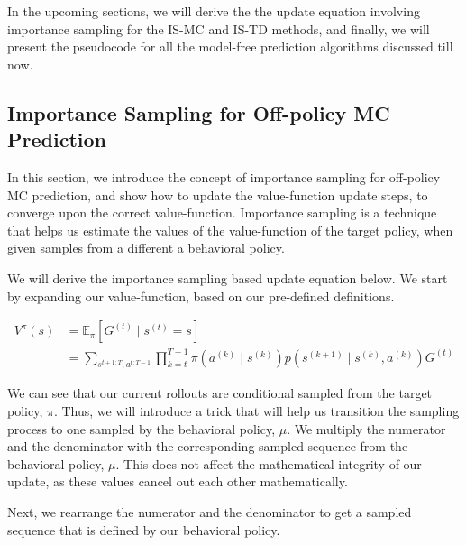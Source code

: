 \documentclass[11pt]{article}
\begin{document}
In the upcoming sections, we will derive the the update equation involving importance sampling for the IS-MC and IS-TD methods, and finally, we will present the pseudocode for all the model-free prediction algorithms discussed till now.



\subsection{Importance Sampling for Off-policy MC Prediction}
In this section, we introduce the concept of importance sampling for off-policy MC prediction, and show how to update the value-function update steps, to converge upon the correct value-function. Importance sampling is a technique that helps us estimate the values of the value-function of the target policy, when given samples from a different a behavioral policy.

We will derive the importance sampling based update equation below. We start by expanding our value-function, based on our pre-defined definitions.

\begin{align} 
V^{\pi}(s) &=\mathbb{E}_{\pi}\left[G^{(t)} \mid s^{(t)}=s\right] \\ 
&=\sum_{s^{t+1: T}, a^{t: T-1}} \prod_{k=t}^{T-1} \pi\left(a^{(k)} \mid s^{(k)}\right) p\left(s^{(k+1)} \mid s^{(k)}, a^{(k)}\right) G^{(t)}
\end{align}

We can see that our current rollouts are conditional sampled from the target policy, $\pi$. Thus, we will introduce a trick that will help us transition the sampling process to one sampled by the behavioral policy, $\mu$. We multiply the numerator and the denominator with the corresponding sampled sequence from the behavioral policy, $\mu$. This does not affect the mathematical integrity of our update, as these values cancel out each other mathematically.

Next, we rearrange the numerator and the denominator to get a sampled sequence that is defined by our behavioral policy. 
\end{document}
